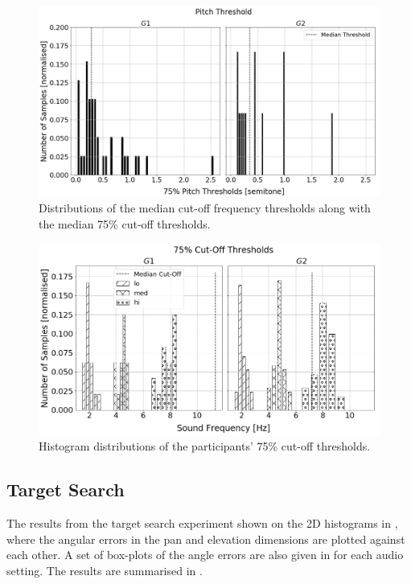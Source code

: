 \documentclass[]{interact}
\begin{document}
\begin{figure}
  \centering
  \includegraphics[width=1.0\textwidth]{figures/pitch_thresholds.png}
  \caption{Distributions of the median cut-off frequency thresholds along with the median 75\% cut-off thresholds. }\label{fig:pitch-thresholds}
\end{figure}

\begin{figure}
  \centering
  \includegraphics[width=1.0\textwidth]{figures/pitch_thresholds_limits.png}
  \caption{Histogram distributions of the participants' 75\% cut-off thresholds. }\label{fig:pitch-thresholds-hist}
\end{figure}

\subsection{Target Search}

The results from the target search experiment shown on the 2D histograms in , where the angular errors in the pan and elevation dimensions are plotted against each other. 
A set of box-plots of the angle errors are also given in  for each audio setting.
The results are summarised in .
\end{document}
